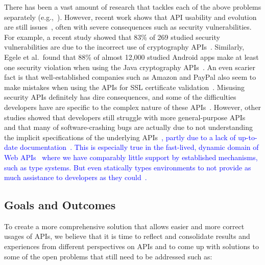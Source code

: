 \documentclass[10pt, conference]{IEEEtran}
\newcommand{\updated}[1]{{\textcolor{blue}{#1}}}
\begin{document}
There has been a vast amount of research that tackles each of the above problems separately (e.g.,~\cite{Subramanian:2014,RobillardInferenceSurvey,RobillardLearn09, NNP+09, ThungLibRec}). However, recent work shows that API usability and evolution are still issues~\cite{NKMB16, BKHT:FSE16, SunshineAPIProtocol}, often with severe consequences such as security vulnerabilities. For example, a recent study showed that 83\% of 269 studied security vulnerabilities are due to the incorrect use of cryptography APIs~\cite{Lazar2014}. Similarly, Egele et al.~found that 88\% of almost 12,000 studied Android apps make at least one security violation when using the Java cryptography APIs~\cite{EgeleBFK13}. An even scarier fact is that well-established companies such as Amazon and PayPal also seem to make mistakes when using the APIs for SSL certificate validation~\cite{GeorgievIJABS12}. Misusing security APIs definitely has dire consequences, and some of the difficulties developers have are specific to the complex nature of these APIs~\cite{NKMB16}. However, other studies showed that developers still struggle with more general-purpose APIs~\cite{SunshineAPIProtocol} and that many of software-crashing bugs are actually due to not understanding the implicit specifications of the underlying APIs~\cite{amani2016mubench}\updated{, partly due to a lack of up-to-date documentation~\cite{RMS17}. This is especially true in the fast-lived, dynamic domain of Web APIs~\cite{WYZ+17} where we have comparably little support by established mechanisms, such as type systems. But even statically types environments to not provide as much assistance to developers as they could~\cite{KS17}.}

\subsection{Goals and Outcomes}\label{sec:goals}
To create a more comprehensive solution that allows easier and more correct usages of APIs, we believe that it is time to reflect and consolidate results and experiences from different perspectives on APIs and to come up with solutions to some of the open problems that still need to be addressed such as:
\end{document}
